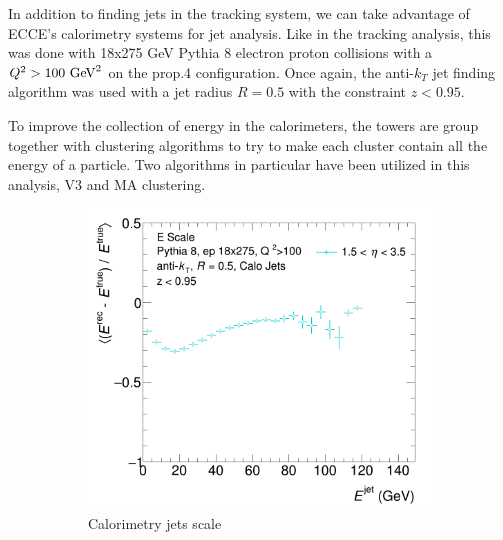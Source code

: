 In addition to finding jets in the tracking system, we can take advantage of ECCE's calorimetry systems for jet analysis.  Like in the tracking analysis, this was done with 18x275 GeV Pythia 8 electron proton collisions with a $Q^2>100\hbox{ GeV}^2$ on the prop.4 configuration.  Once again, the anti-$k_T$ jet finding algorithm was used with a jet radius $R=0.5$ with the constraint $z<0.95$.  

To improve the collection of energy in the calorimeters, the towers are group together with clustering algorithms to try to make each cluster contain all the energy of a particle.  Two algorithms in particular have been utilized in this analysis, V3 and MA clustering.  


\begin{figure}
    \centering
    \begin{subfigure}{0.4\textwidth}
        \centering
        \includegraphics[width=\linewidth]{figs/jet_plots/JES_calo_grouped.png}
        \caption{Calorimetry jets scale}
        \label{fig:calo_energy_scale}
    \end{subfigure}
    \hfill
    \begin{subfigure}{0.4\textwidth}
        \centering

\end{subfigure}
\end{figure}
